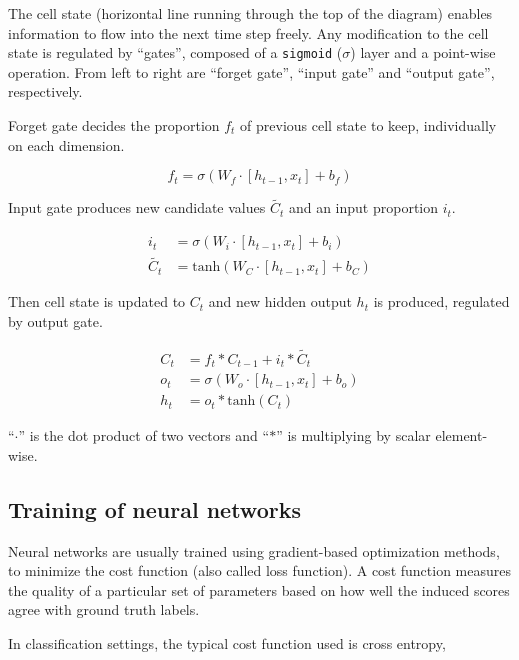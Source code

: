 \documentclass[11pt,a4paper]{report}
\begin{document}

The cell state (horizontal line running through the top of the diagram) enables information to flow into the next time step freely.
Any modification to the cell state is regulated by \enquote{gates}, composed of a \texttt{sigmoid} (\(\sigma\)) layer and a point-wise operation.
From left to right are \enquote{forget gate}, \enquote{input gate} and \enquote{output gate}, respectively.

Forget gate decides the proportion \(f_t\) of previous cell state to keep, individually on each dimension.

\begin{equation*}
  f_t = \sigma (W_f \cdot [h_{t-1}, x_t] + b_f)
\end{equation*}

Input gate produces new candidate values \(\tilde{C_t}\) and an input proportion \(i_t\).

\begin{align*}
  i_t & = \sigma (W_i \cdot [h_{t-1}, x_t] + b_i) \\
  \tilde{C_t} & = \mathrm{tanh} (W_C \cdot [h_{t-1}, x_t] + b_C)
\end{align*}

Then cell state is updated to \(C_t\) and new hidden output \(h_t\) is produced, regulated by output gate.

\begin{align*}
  C_t & = f_t * C_{t-1} + i_t * \tilde{C_t} \\
  o_t & = \sigma (W_o \cdot [h_{t-1}, x_t] + b_o) \\
  h_t & = o_t * \mathrm{tanh}(C_t)
\end{align*}

\enquote{\(\cdot\)} is the dot product of two vectors and \enquote{\(*\)} is multiplying by scalar element-wise.

\subsection{Training of neural networks}

Neural networks are usually trained using gradient-based optimization methods, to minimize the cost function (also called loss function).
A cost function measures the quality of a particular set of parameters based on how well the induced scores agree with ground truth labels.

In classification settings, the typical cost function used is cross entropy,
\end{document}
